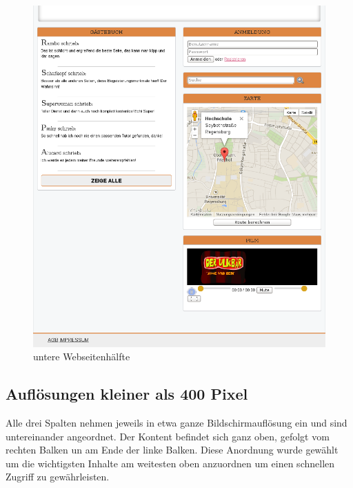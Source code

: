 \begin{figure}[!htbp]
\centering
\includegraphics[width=1\linewidth]{../Screenshots/responsive8002}
\caption{untere Webseitenhälfte}
\label{fig:responsive8002}
\end{figure}


\newpage

\subsection{Auflösungen kleiner als 400 Pixel}

Alle drei Spalten nehmen jeweils in etwa ganze Bildschirmauflösung ein und sind untereinander angeordnet. Der Kontent befindet sich ganz oben,  gefolgt vom rechten Balken un am Ende der linke Balken. Diese Anordnung wurde gewählt um die wichtigsten Inhalte am weitesten oben anzuordnen um einen schnellen Zugriff zu gewährleisten.


